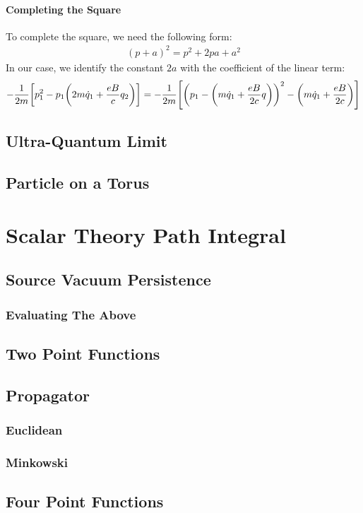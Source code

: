\documentclass[12pt]{article}
\begin{document}
\paragraph{Completing the Square}
To complete the square, we need the following form:
\begin{align*}
  (p+a)^2=p^2+2pa+a^2
\end{align*}
In our case, we identify the constant $2a$ with the coefficient of the linear term:
\begin{align*}
  -\frac{1}{2m}\qty[p_1^2-p_1\qty(2m\dot{q}_1+\frac{eB}{c}q_2)]
  =-\frac{1}{2m}\qty[\qty(p_1-\qty(m\dot{q}_1+\frac{eB}{2c}q))^2
  -\qty(m\dot{q}_1+\frac{eB}{2c})]
\end{align*}
\subsection{Ultra-Quantum Limit}

\subsection{Particle on a Torus}

\section{Scalar Theory Path Integral}

\subsection{Source Vacuum Persistence}

\subsubsection{Evaluating The Above}

\subsection{Two Point Functions}

\subsection{Propagator}

\subsubsection{Euclidean}

\subsubsection{Minkowski}

\subsection{Four Point Functions}
\end{document}
